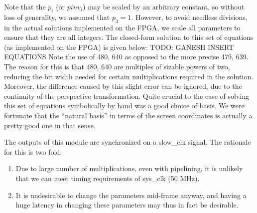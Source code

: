 \documentclass{article}
\begin{document}
Note that the $p_i$ (or $pinv_i$) may be scaled by an arbitrary constant, so without loss of generality, we assumed that $p_3 = 1$.
However, to avoid needless divisions, in the actual solutions implemented on the FPGA,
we scale all parameters to ensure that they are all integers.
The closed-form solution to this set of equations (as implemented on the FPGA) is given below:
TODO: GANESH INSERT EQUATIONS
Note the use of 480, 640 as opposed to the more precise 479, 639.
The reason for this is that 480, 640 are multiples of sizable powers of two, reducing the bit width needed for certain multiplications required in the solution.
Moreover, the difference caused by this slight error can be ignored, due to the continuity of the perspective transformation.
Quite crucial to the ease of solving this set of equations symbolically by hand was a good choice of basis.
We were fortunate that the ``natural basis'' in terms of the screen coordinates is actually a pretty good one in that sense.

The outputs of this module are synchronized on a slow\_clk signal.
The rationale for this is two fold:
\begin{enumerate}
    \item Due to large number of multiplications, even with pipelining, it is unlikely that we can meet timing requirements of sys\_clk (50 MHz).
    \item It is undesirable to change the parameters mid-frame anyway, and having a huge latency in changing these parameters may thus in fact be desirable.
\end{enumerate}
\end{document}
